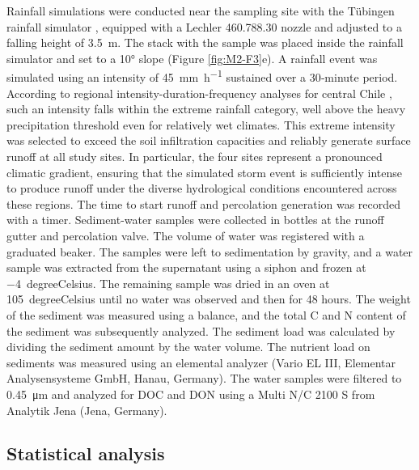 \FloatBarrier

Rainfall simulations were conducted near the sampling site with the Tübingen rainfall simulator \citep{Iserloh2013,Seitz2015}, equipped with a Lechler 460.788.30 nozzle and adjusted to a falling height of \SI{3.5}{\meter}. The stack with the sample was placed inside the rainfall simulator and set to a \ang{10} slope (Figure \ref{fig:M2-F3}e). A rainfall event was simulated using an intensity of \SI{45}{\milli\metre\per\hour} sustained over a 30‐minute period. According to regional intensity-duration-frequency analyses for central Chile \citep{PizarroTapia2020}, such an intensity falls within the extreme rainfall category, well above the heavy precipitation threshold even for relatively wet climates. This extreme intensity was selected to exceed the soil infiltration capacities and reliably generate surface runoff at all study sites. In particular, the four sites represent a pronounced climatic gradient, ensuring that the simulated storm event is sufficiently intense to produce runoff under the diverse hydrological conditions encountered across these regions. The time to start runoff and percolation generation was recorded with a timer. Sediment-water samples were collected in bottles at the runoff gutter and percolation valve. The volume of water was registered with a graduated beaker. The samples were left to sedimentation by gravity, and a water sample was extracted from the supernatant using a siphon and frozen at \SI{-4}{degreeCelsius}. The remaining sample was dried in an oven at \SI{105}{degreeCelsius} until no water was observed and then for 48 hours. The weight of the sediment was measured using a balance, and the total C and N content of the sediment was subsequently analyzed. The sediment load was calculated by dividing the sediment amount by the water volume. The nutrient load on sediments was measured using an elemental analyzer (Vario EL III, Elementar Analysensysteme GmbH, Hanau, Germany). The water samples were filtered to \SI{0.45}{\micro\meter} and analyzed for DOC and DON using a Multi N/C 2100 S from Analytik Jena (Jena, Germany).

\subsection{Statistical analysis}

